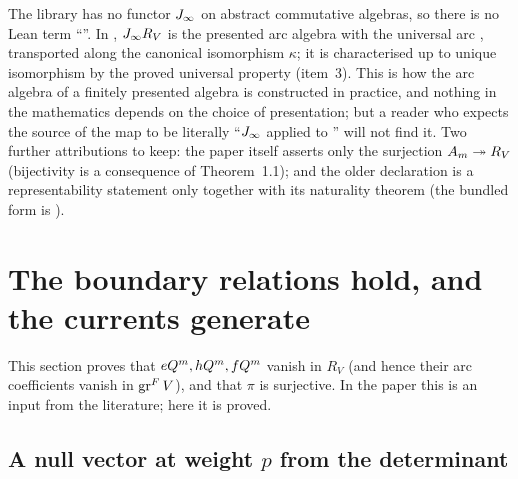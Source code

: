 \begin{warning}[title={The remaining caveat: $\ltwentyJ R_V$ is realised, not constructed by a functor}]
The library has no functor $J_\infty$ on abstract commutative algebras, so there is no Lean term ``''. In
, $\ltwentyJ R_V$ is the presented arc algebra  with the universal
arc , transported along the canonical isomorphism $\kappa$; it is characterised up to unique
isomorphism by the proved universal property (item~3). This is how the arc algebra of a finitely presented algebra is
constructed in practice, and nothing in the mathematics depends on the choice of presentation; but a reader who expects the
source of the map to be literally ``$J_\infty$ applied to '' will not find it. Two further attributions to keep:
the paper itself asserts only the surjection $A_m\twoheadrightarrow R_V$ (bijectivity is a consequence of Theorem~1.1);
and the older declaration  is a representability statement only together with its naturality
theorem  (the bundled form is ).
\end{warning}


\section{The boundary relations hold, and the currents generate}\label{l20:sec:m0}

This section proves that $eQ^m,hQ^m,fQ^m$ vanish in $R_V$ (and hence their arc coefficients vanish in
$\operatorname{gr}^F V$), and that $\pi$ is surjective. In the paper this is an input from the literature; here it is proved.

\subsection{A null vector at weight $p$ from the determinant}

